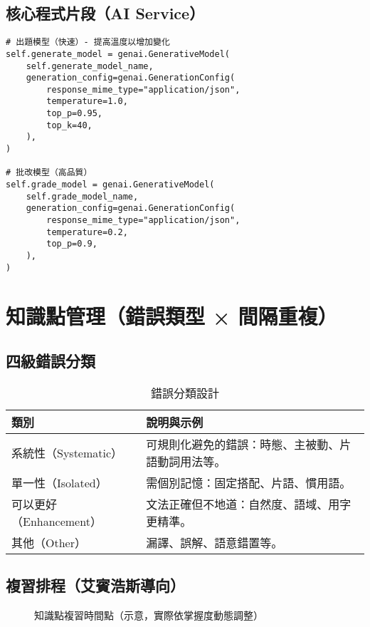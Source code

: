 \documentclass[12pt,a4paper]{article}
\begin{document}
\subsection{核心程式片段（AI Service）}
\begin{lstlisting}[style=py, caption={雙模型初始化與參數（摘錄）}, label={lst:aisvc}]
# 出題模型（快速）- 提高溫度以增加變化
self.generate_model = genai.GenerativeModel(
    self.generate_model_name,
    generation_config=genai.GenerationConfig(
        response_mime_type="application/json",
        temperature=1.0,
        top_p=0.95,
        top_k=40,
    ),
)

# 批改模型（高品質）
self.grade_model = genai.GenerativeModel(
    self.grade_model_name,
    generation_config=genai.GenerationConfig(
        response_mime_type="application/json",
        temperature=0.2,
        top_p=0.9,
    ),
)
\end{lstlisting}

\section{知識點管理（錯誤類型 × 間隔重複）}
\subsection{四級錯誤分類}
\begin{table}[ht]
  \centering
  \begin{tabular}{P{3cm}P{10cm}}
    \toprule
    \textbf{類別} & \textbf{說明與示例} \\
    \midrule
    系統性（Systematic） & 可規則化避免的錯誤：時態、主被動、片語動詞用法等。 \\
    單一性（Isolated） & 需個別記憶：固定搭配、片語、慣用語。 \\
    可以更好（Enhancement） & 文法正確但不地道：自然度、語域、用字更精準。 \\
    其他（Other） & 漏譯、誤解、語意錯置等。 \\
    \bottomrule
  \end{tabular}
  \caption{錯誤分類設計}
\end{table}

\subsection{複習排程（艾賓浩斯導向）}
\begin{figure}[ht]
  \centering
  \caption{知識點複習時間點（示意，實際依掌握度動態調整）}
\end{figure}
\end{document}
